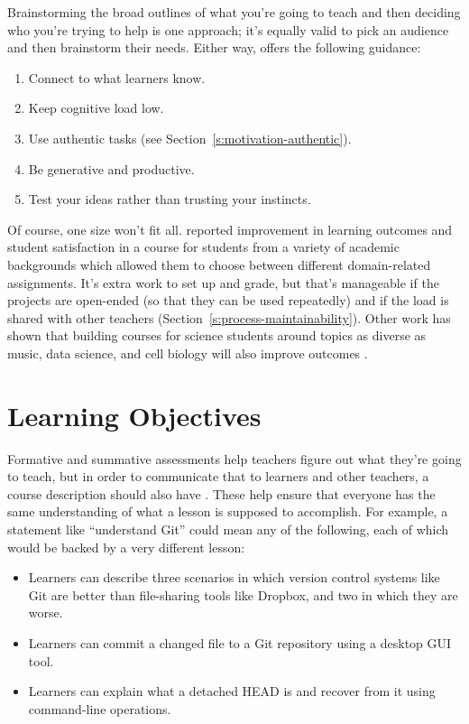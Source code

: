 Brainstorming the broad outlines of what you're going to teach and
then deciding who you're trying to help is one approach; it's equally
valid to pick an audience and then brainstorm their needs. Either way,
\cite{Guzd2016} offers the following guidance:

\begin{enumerate}
\item
  Connect to what learners know.
\item
  Keep cognitive load low.
\item
  Use authentic tasks (see Section~\ref{s:motivation-authentic}).
\item
  Be generative and productive.
\item
  Test your ideas rather than trusting your instincts.
\end{enumerate}

Of course, one size won't fit all. \cite{Alha2018} reported
improvement in learning outcomes and student satisfaction in a course
for students from a variety of academic backgrounds which allowed them
to choose between different domain-related assignments. It's extra
work to set up and grade, but that's manageable if the projects are
open-ended (so that they can be used repeatedly) and if the load is
shared with other teachers (Section~\ref{s:process-maintainability}).
Other work has shown that building courses for science students around
topics as diverse as music, data science, and cell biology will also
improve outcomes
\cite{Pete2017,Dahl2018,Ritz2018}.

\section{Learning Objectives}\label{s:process-objectives}

Formative and summative assessments help teachers figure out what
they're going to teach, but in order to communicate that to learners
and other teachers, a course description should also have . These help ensure that
everyone has the same understanding of what a lesson is supposed to
accomplish. For example, a statement like ``understand Git'' could mean
any of the following, each of which would be backed by a very
different lesson:

\begin{itemize}
\item
  Learners can describe three scenarios in which version control
  systems like Git are better than file-sharing tools like Dropbox,
  and two in which they are worse.
\item
  Learners can commit a changed file to a Git repository using a
  desktop GUI tool.
\item
  Learners can explain what a detached HEAD is and recover from it
  using command-line operations.
\end{itemize}

